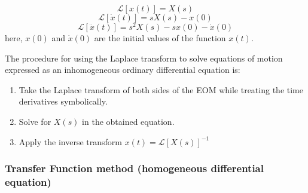 \documentclass[12pt,letter]{article}
\numberwithin{ex}{section} %
\numberwithin{re}{section} %
\newcommand{\Laplace}[1]{\ensuremath{\mathcal{L}{\left[#1\right]}}}
\begin{document}
		\begin{equation}
			\Laplace{x(t)} = X(s)
		\end{equation}		
		\begin{equation}
			\Laplace{\dot{x}(t)} = sX(s)-x(0)
		\end{equation}	
		\begin{equation}
			\Laplace{\ddot{x}(t)} = s^2X(s)-sx(0) - \dot{x}(0)
		\end{equation}	
		here, $x(0)$ and $\dot{x}(0)$ are the initial values of the function $x(t)$. 
		


The procedure for using the Laplace transform to solve equations of motion expressed as an inhomogeneous ordinary differential equation is:
\begin{enumerate}
	\item Take the Laplace transform of both sides of the EOM while treating the time derivatives symbolically.
	\item Solve for $X(s)$ in the obtained equation.
	\item Apply the inverse transform $x(t) = \Laplace{X(s)}^{-1}$
\end{enumerate}

\subsubsection{Transfer Function method (homogeneous differential equation)}
\end{document}
